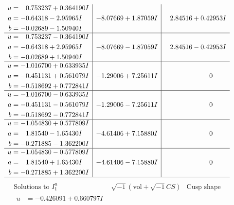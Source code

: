 \documentclass[1p]{elsarticle_modified}
\theoremstyle{definition}
\newcommand{\I}{\sqrt{-1}}
\begin{document}
$$\begin{array}{c|c|c}
\begin{aligned}
u &= \phantom{-}0.753237 + 0.364190 I \\
a &= -0.64318 - 2.95965 I \\
b &= -0.02689 - 1.50940 I\end{aligned}
 & -8.07669 + 1.87059 I & \phantom{-}2.84516 + 0.42953 I \\ \hline\begin{aligned}
u &= \phantom{-}0.753237 - 0.364190 I \\
a &= -0.64318 + 2.95965 I \\
b &= -0.02689 + 1.50940 I\end{aligned}
 & -8.07669 - 1.87059 I & \phantom{-}2.84516 - 0.42953 I \\ \hline\begin{aligned}
u &= -1.016700 + 0.633935 I \\
a &= -0.451131 + 0.561079 I \\
b &= -0.518692 + 0.772841 I\end{aligned}
 & -1.29006 + 7.25611 I & \phantom{-0.000000 } 0 \\ \hline\begin{aligned}
u &= -1.016700 - 0.633935 I \\
a &= -0.451131 - 0.561079 I \\
b &= -0.518692 - 0.772841 I\end{aligned}
 & -1.29006 - 7.25611 I & \phantom{-0.000000 } 0 \\ \hline\begin{aligned}
u &= -1.054830 + 0.577809 I \\
a &= \phantom{-}1.81540 - 1.65430 I \\
b &= -0.271885 - 1.362200 I\end{aligned}
 & -4.61406 + 7.15880 I & \phantom{-0.000000 } 0 \\ \hline\begin{aligned}
u &= -1.054830 - 0.577809 I \\
a &= \phantom{-}1.81540 + 1.65430 I \\
b &= -0.271885 + 1.362200 I\end{aligned}
 & -4.61406 - 7.15880 I & \phantom{-0.000000 } 0\\
 \hline 
 \end{array}$$\newpage$$\begin{array}{c|c|c}  
\text{Solutions to }I^u_{1}& \I (\text{vol} + \sqrt{-1}CS) & \text{Cusp shape}\\
 \hline 
\begin{aligned}
u &= -0.426091 + 0.660797 I \\

\end{aligned}
\end{array}$$
\end{document}
